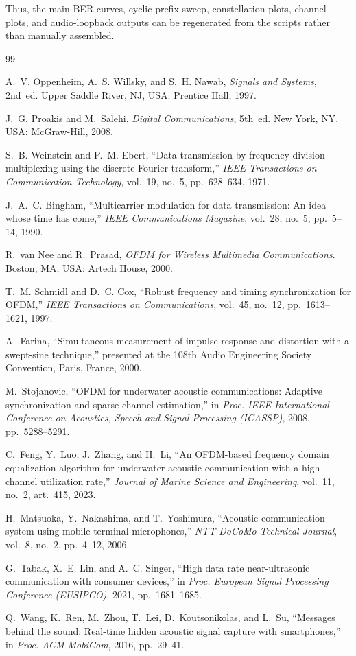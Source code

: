 \documentclass[conference]{IEEEtran}
\begin{document}
Thus, the main BER curves, cyclic-prefix sweep, constellation plots, channel plots, and audio-loopback outputs can be regenerated from the scripts rather than manually assembled.

\begin{thebibliography}{99}

A.~V. Oppenheim, A.~S. Willsky, and S.~H. Nawab, \emph{Signals and Systems}, 2nd~ed. Upper Saddle River, NJ, USA: Prentice Hall, 1997.

J.~G. Proakis and M.~Salehi, \emph{Digital Communications}, 5th~ed. New York, NY, USA: McGraw-Hill, 2008.

S.~B. Weinstein and P.~M. Ebert, ``Data transmission by frequency-division multiplexing using the discrete Fourier transform,'' \emph{IEEE Transactions on Communication Technology}, vol.~19, no.~5, pp.~628--634, 1971.

J.~A.~C. Bingham, ``Multicarrier modulation for data transmission: An idea whose time has come,'' \emph{IEEE Communications Magazine}, vol.~28, no.~5, pp.~5--14, 1990.

R.~van Nee and R.~Prasad, \emph{OFDM for Wireless Multimedia Communications}. Boston, MA, USA: Artech House, 2000.

T.~M. Schmidl and D.~C. Cox, ``Robust frequency and timing synchronization for OFDM,'' \emph{IEEE Transactions on Communications}, vol.~45, no.~12, pp.~1613--1621, 1997.

A.~Farina, ``Simultaneous measurement of impulse response and distortion with a swept-sine technique,'' presented at the 108th Audio Engineering Society Convention, Paris, France, 2000.


M.~Stojanovic, ``OFDM for underwater acoustic communications: Adaptive synchronization and sparse channel estimation,'' in \emph{Proc. IEEE International Conference on Acoustics, Speech and Signal Processing (ICASSP)}, 2008, pp.~5288--5291.

C.~Feng, Y.~Luo, J.~Zhang, and H.~Li,
``An OFDM-based frequency domain equalization algorithm for underwater acoustic communication with a high channel utilization rate,''
\emph{Journal of Marine Science and Engineering}, vol.~11, no.~2, art.~415, 2023.

H.~Matsuoka, Y.~Nakashima, and T.~Yoshimura, ``Acoustic communication system using mobile terminal microphones,'' \emph{NTT DoCoMo Technical Journal}, vol.~8, no.~2, pp.~4--12, 2006.

G.~Tabak, X.~E. Lin, and A.~C. Singer, ``High data rate near-ultrasonic communication with consumer devices,'' in \emph{Proc. European Signal Processing Conference (EUSIPCO)}, 2021, pp.~1681--1685.

Q.~Wang, K.~Ren, M.~Zhou, T.~Lei, D.~Koutsonikolas, and L.~Su, ``Messages behind the sound: Real-time hidden acoustic signal capture with smartphones,'' in \emph{Proc. ACM MobiCom}, 2016, pp.~29--41.

\end{thebibliography}
\end{document}
